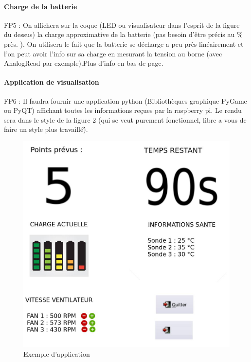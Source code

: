 \documentclass[fleqn,10pt]{SelfArx} %
\begin{document}
\paragraph{Charge de la batterie}
FP5 : On affichera sur la coque (LED ou visualisateur dans l'esprit de la figure du dessus) la charge approximative de la batterie (pas besoin d'être précis au \% près. ). On utilisera le fait que la batterie se décharge a peu près linéairement et l'on peut avoir l'info sur sa charge en mesurant la tension au borne (avec AnalogRead par exemple).Plus d'info en bas de page.
\paragraph{Application de visualisation}
FP6 : Il faudra fournir une application python (Bibliothèques graphique PyGame ou PyQT) affichant toutes les informations reçues par la raspberry pi. Le rendu sera dans le style de la figure 2 (qui se veut purement fonctionnel, libre a vous de faire un style plus travaillé\^\^).
\begin{figure}[ht]\centering %
	\includegraphics[width=\linewidth]{app}
	\caption{Exemple d'application}
	\label{fig:view}
\end{figure}
\end{document}
